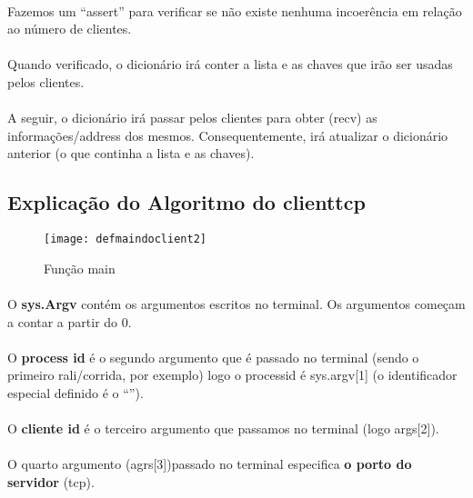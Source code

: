 \documentclass[a4paper,11pt,onecolumn,oneside]{article}
\begin{document}
\paragraph{ }
Fazemos um “assert” para verificar se não existe nenhuma incoerência em relação ao número de clientes.
\paragraph{ }
Quando verificado, o dicionário irá conter a lista e as chaves que irão ser usadas pelos clientes.
\paragraph{ }
A seguir, o dicionário irá passar pelos clientes para obter (recv) as informações/address dos mesmos. Consequentemente, irá atualizar o dicionário anterior (o que continha a lista e as chaves).

\newpage

\subsection{Explicação do Algoritmo do client\textunderscore tcp}

\begin{figure} [h]
\center
\texttt{[image: defmaindoclient2]}
\caption{Função main}
\label{main}
\end{figure}

\paragraph{ }
O \textbf{sys.Argv} contém os argumentos escritos no terminal. Os argumentos começam a contar a partir do 0.
\paragraph{ }
O \textbf{process id} é o segundo argumento que é passado no terminal (sendo o primeiro rali/corrida, por exemplo) logo o process\textunderscore id é sys.argv[1] (o identificador especial definido é o “\textunderscore”).
\paragraph{ }
O \textbf{cliente id} é o terceiro argumento que passamos no terminal (logo args[2]).
\paragraph{ }
O quarto argumento (agrs[3])passado no terminal  especifica \textbf{o porto do servidor} (\ac{tcp}).
\end{document}
